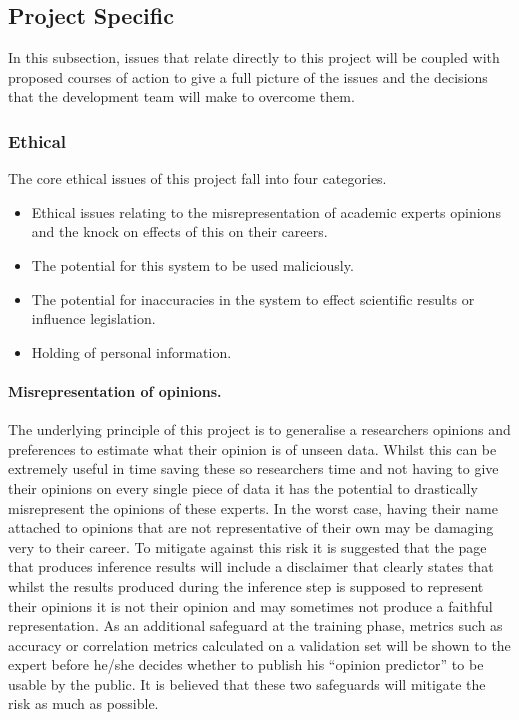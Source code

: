 \documentclass{ecmm427_assignment}
\begin{document}
\subsection{Project Specific}

In this subsection, issues that relate directly to this project will
be coupled with proposed courses of action to give a full picture
of the issues and the decisions that the development team will make
to overcome them. 

\subsubsection{Ethical}

The core ethical issues of this project fall into four categories. 
\begin{itemize}
\item Ethical issues relating to the misrepresentation of academic experts
opinions and the knock on effects of this on their careers.
\item The potential for this system to be used maliciously.
\item The potential for inaccuracies in the system to effect scientific
results or influence legislation. 
\item Holding of personal information.
\end{itemize}

\paragraph{Misrepresentation of opinions.}

The underlying principle of this project is to generalise a researchers
opinions and preferences to estimate what their opinion is of unseen
data. Whilst this can be extremely useful in time saving these so
researchers time and not having to give their opinions on every single
piece of data it has the potential to drastically misrepresent the
opinions of these experts. In the worst case, having their name attached
to opinions that are not representative of their own may be damaging
very to their career. To mitigate against this risk it is suggested
that the page that produces inference results will include a disclaimer
that clearly states that whilst the results produced during the inference
step is supposed to represent their opinions it is not their opinion
and may sometimes not produce a faithful representation. As an additional
safeguard at the training phase, metrics such as accuracy or correlation
metrics calculated on a validation set will be shown to the expert
before he/she decides whether to publish his ``opinion predictor''
to be usable by the public. It is believed that these two safeguards
will mitigate the risk as much as possible. 
\end{document}
